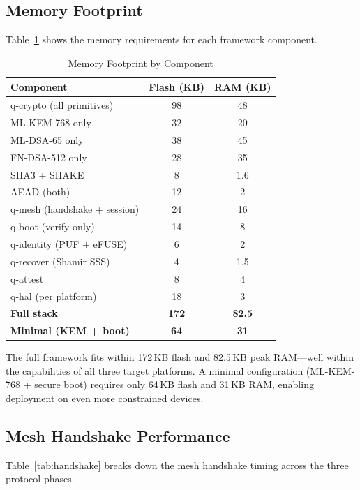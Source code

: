 \documentclass[conference,10pt]{IEEEtran}
\begin{document}
\subsection{Memory Footprint}

Table~\ref{tab:memory} shows the memory requirements for each framework component.

\begin{table}[t]
\centering
\caption{Memory Footprint by Component}
\label{tab:memory}
\begin{tabular}{lcc}
\toprule
\textbf{Component} & \textbf{Flash (KB)} & \textbf{RAM (KB)} \\
\midrule
q-crypto (all primitives) & 98 & 48 \\
\quad ML-KEM-768 only & 32 & 20 \\
\quad ML-DSA-65 only & 38 & 45 \\
\quad FN-DSA-512 only & 28 & 35 \\
\quad SHA3 + SHAKE & 8 & 1.6 \\
\quad AEAD (both) & 12 & 2 \\
q-mesh (handshake + session) & 24 & 16 \\
q-boot (verify only) & 14 & 8 \\
q-identity (PUF + eFUSE) & 6 & 2 \\
q-recover (Shamir SSS) & 4 & 1.5 \\
q-attest & 8 & 4 \\
q-hal (per platform) & 18 & 3 \\
\midrule
\textbf{Full stack} & \textbf{172} & \textbf{82.5} \\
\textbf{Minimal (KEM + boot)} & \textbf{64} & \textbf{31} \\
\bottomrule
\end{tabular}
\end{table}

The full framework fits within 172\,KB flash and 82.5\,KB peak RAM---well within the capabilities of all three target platforms. A minimal configuration (ML-KEM-768 + secure boot) requires only 64\,KB flash and 31\,KB RAM, enabling deployment on even more constrained devices.

\subsection{Mesh Handshake Performance}

Table~\ref{tab:handshake} breaks down the mesh handshake timing across the three protocol phases.
\end{document}
